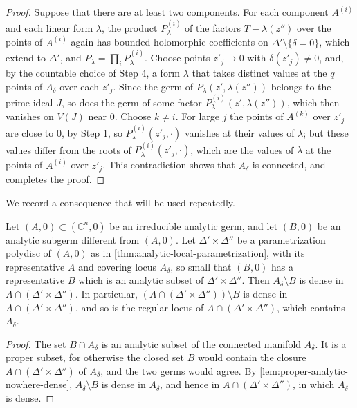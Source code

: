 \begin{proof}
Suppose that there are at least two components. For each component $A^{(i)}$ and each linear form $\lambda$, the product $P^{(i)}_\lambda$ of the factors $T-\lambda(z'')$ over the points of $A^{(i)}$ again has bounded holomorphic coefficients on $\Delta'\setminus\{\delta=0\}$, which extend to $\Delta'$, and $P_\lambda=\prod_iP^{(i)}_\lambda$. Choose points $z'_j\to0$ with $\delta(z'_j)\neq0$, and, by the countable choice of Step 4, a form $\lambda$ that takes distinct values at the $q$ points of $A_\delta$ over each $z'_j$. Since the germ of $P_\lambda(z',\lambda(z''))$ belongs to the prime ideal $J$, so does the germ of some factor $P^{(i)}_\lambda(z',\lambda(z''))$, which then vanishes on $V(J)$ near $0$. Choose $k\neq i$. For large $j$ the points of $A^{(k)}$ over $z'_j$ are close to $0$, by Step 1, so $P^{(i)}_\lambda(z'_j,\cdot)$ vanishes at their values of $\lambda$; but these values differ from the roots of $P^{(i)}_\lambda(z'_j,\cdot)$, which are the values of $\lambda$ at the points of $A^{(i)}$ over $z'_j$. This contradiction shows that $A_\delta$ is connected, and completes the proof.
\end{proof}

We record a consequence that will be used repeatedly.

\begin{corollary}\label{cor:analytic-subgerm-dense}
Let $(A,0)\subset(\mathbb C^n,0)$ be an irreducible analytic germ, and let $(B,0)$ be an analytic subgerm different from $(A,0)$. Let $\Delta'\times\Delta''$ be a parametrization polydisc of $(A,0)$ as in \cref{thm:analytic-local-parametrization}, with its representative $A$ and covering locus $A_\delta$, so small that $(B,0)$ has a representative $B$ which is an analytic subset of $\Delta'\times\Delta''$. Then $A_\delta\setminus B$ is dense in $A\cap(\Delta'\times\Delta'')$. In particular, $(A\cap(\Delta'\times\Delta''))\setminus B$ is dense in $A\cap(\Delta'\times\Delta'')$, and so is the regular locus of $A\cap(\Delta'\times\Delta'')$, which contains $A_\delta$.
\end{corollary}
\begin{proof}
The set $B\cap A_\delta$ is an analytic subset of the connected manifold $A_\delta$. It is a proper subset, for otherwise the closed set $B$ would contain the closure $A\cap(\Delta'\times\Delta'')$ of $A_\delta$, and the two germs would agree. By \cref{lem:proper-analytic-nowhere-dense}, $A_\delta\setminus B$ is dense in $A_\delta$, and hence in $A\cap(\Delta'\times\Delta'')$, in which $A_\delta$ is dense.
\end{proof}

